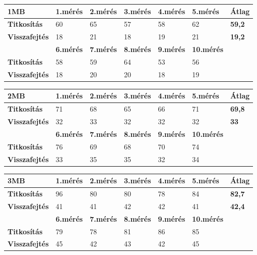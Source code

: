 \begin{center}
	
	
	\begin{tabular}{|p{2.4cm}|p{1.7cm}|p{1.7cm}|p{1.7cm}|p{1.7cm}|p{1.8cm}|p{1.2cm}|}
		\hline
		\textbf{1MB} & \textbf{1.mérés} & \textbf{2.mérés} & \textbf{3.mérés} & \textbf{4.mérés} & \textbf{5.mérés} & \textbf{Átlag} \\
		\hline
		\textbf{Titkosítás}&60&65&57&58&62&\textbf{59,2}\\
		\hline
		\textbf{Visszafejtés}&18&21&18&19&21&\textbf{19,2}  \\
		\hline
		& \textbf{6.mérés} & \textbf{7.mérés} & \textbf{8.mérés} & \textbf{9.mérés} & \textbf{10.mérés} & \\
		\hline
		\textbf{Titkosítás}&58&59&64&53&56& \\
		\hline
		\textbf{Visszafejtés}&18&20&20&18&19& \\
		\hline
	\end{tabular}
\end{center}

\begin{center}
	
	
	\begin{tabular}{|p{2.4cm}|p{1.7cm}|p{1.7cm}|p{1.7cm}|p{1.7cm}|p{1.8cm}|p{1.2cm}|}
		\hline
		\textbf{2MB} & \textbf{1.mérés} & \textbf{2.mérés} & \textbf{3.mérés} & \textbf{4.mérés} & \textbf{5.mérés} & \textbf{Átlag} \\
		\hline
		\textbf{Titkosítás}&71&68&65&66&71&\textbf{69,8}\\
		\hline
		\textbf{Visszafejtés}&32&33&32&32&32&\textbf{33} \\
		\hline
		& \textbf{6.mérés} & \textbf{7.mérés} & \textbf{8.mérés} & \textbf{9.mérés} & \textbf{10.mérés} & \\
		\hline
		\textbf{Titkosítás}&76&69&68&70&74& \\
		\hline
		\textbf{Visszafejtés}&33&35&35&32&34& \\
		\hline
	\end{tabular}
\end{center}

\begin{center}
	
	
	\begin{tabular}{|p{2.4cm}|p{1.7cm}|p{1.7cm}|p{1.7cm}|p{1.7cm}|p{1.8cm}|p{1.2cm}|}
		\hline
		\textbf{3MB} & \textbf{1.mérés} & \textbf{2.mérés} & \textbf{3.mérés} & \textbf{4.mérés} & \textbf{5.mérés} & \textbf{Átlag} \\
		\hline
		\textbf{Titkosítás}&96&80&80&78&84&\textbf{82,7}\\
		\hline
		\textbf{Visszafejtés}&41&41&42&42&41&\textbf{42,4}\\
		\hline
		& \textbf{6.mérés} & \textbf{7.mérés} & \textbf{8.mérés} & \textbf{9.mérés} & \textbf{10.mérés} & \\
		\hline
		\textbf{Titkosítás}&79&78&81&86&85& \\
		\hline
		\textbf{Visszafejtés}&45&42&43&42&45& \\
		\hline
	\end{tabular}
\end{center}

